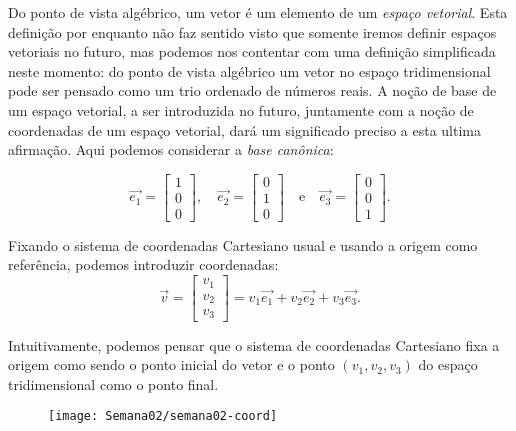 Do ponto de vista algébrico, um vetor é um elemento de um {\it espaço vetorial}. Esta definição por enquanto não faz sentido visto que somente iremos definir espaços vetoriais no futuro, mas podemos nos contentar com uma definição simplificada neste momento: do ponto de vista algébrico um vetor no espaço tridimensional pode ser pensado como um trio ordenado de números reais. A noção de base de um espaço vetorial, a ser introduzida no futuro, juntamente com a noção de coordenadas de um espaço vetorial, dará um significado preciso a esta ultima afirmação. Aqui podemos considerar a {\it base canônica}:

\begin{equation}
\vec{e_1} =
\left[
\begin{array}{c}
1 \\
0 \\
0
\end{array}
\right], \quad
\vec{e_2} =
\left[
\begin{array}{c}
0 \\
1 \\
0
\end{array}
\right] \quad  \text{e} \quad
\vec{e_3} =
\left[
\begin{array}{c}
0 \\
0 \\
1
\end{array}
\right].
\end{equation}


Fixando o sistema de coordenadas Cartesiano usual e usando a origem como referência, podemos introduzir coordenadas:
\begin{equation}
\vec{v} =
\left[
  \begin{array}{c}
    v_1 \\
    v_2 \\
    v_3
  \end{array}
\right]
= v_1 \vec{e_1} + v_2 \vec{e_2} + v_3 \vec{e_3}.
\end{equation}



\noindent Intuitivamente, podemos pensar que o sistema de coordenadas Cartesiano fixa a origem como sendo o ponto inicial do vetor e o ponto $(v_1, v_2, v_3)$ do espaço tridimensional como o ponto final.

\begin{figure}[h!]
\begin{center}
\texttt{[image: Semana02/semana02-coord]}
\end{center}
\end{figure}

